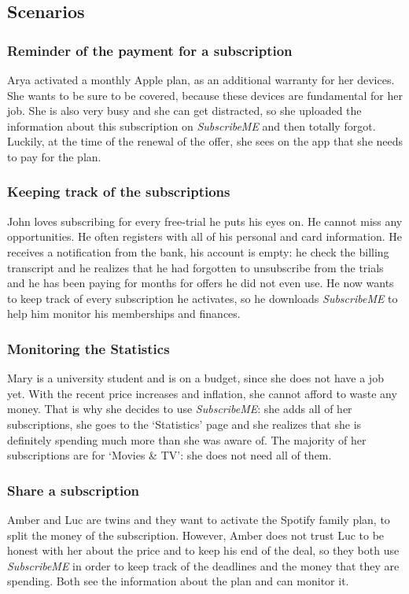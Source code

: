 \documentclass[11pt]{article}
\begin{document}
\subsection{Scenarios}\label{sub:scenarios}
\subsubsection{Reminder of the payment for a subscription}
Arya activated a monthly Apple plan, as an additional warranty for her devices. She wants to be sure to be covered, because these devices are fundamental for her job. She is also very busy and she can get distracted, so she uploaded the information about this subscription on \textit{SubscribeME} and then totally forgot. Luckily, at the time of the renewal of the offer, she sees on the app that she needs to pay for the plan.

\subsubsection{Keeping track of the subscriptions}
John loves subscribing for every free-trial he puts his eyes on. He cannot miss any opportunities. He often registers with all of his personal and card information. He receives a notification from the bank, his account is empty: he check the billing transcript and he realizes that he had forgotten to unsubscribe from the trials and he has been paying for months for offers he did not even use. He now wants to keep track of every subscription he activates, so he downloads \textit{SubscribeME} to help him monitor his memberships and finances.

\subsubsection{Monitoring the Statistics}
Mary is a university student and is on a budget, since she does not have a job yet. With the recent price increases and inflation, she cannot afford to waste any money. That is why she decides to use \textit{SubscribeME}: she adds all of her subscriptions, she goes to the `Statistics' page and she realizes that she is definitely spending much more than she was aware of. The majority of her subscriptions are for `Movies \& TV': she does not need all of them.

\subsubsection{Share a subscription}
Amber and Luc are twins and they want to activate the Spotify family plan, to split the money of the subscription. However, Amber does not trust Luc to be honest with her about the price and to keep his end of the deal, so they both use \textit{SubscribeME} in order to keep track of the deadlines and the money that they are spending. Both see the information about the plan and can monitor it.
\end{document}
